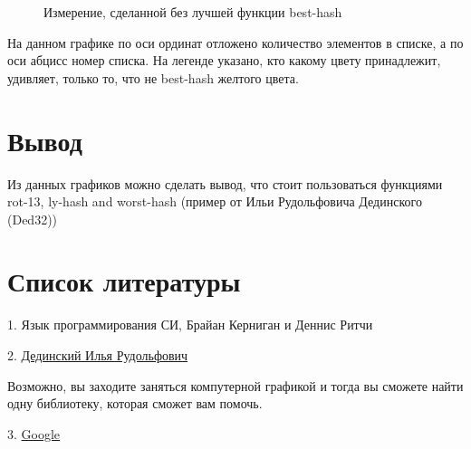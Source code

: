 \documentclass[a4paper,12pt]{article}
\begin{document}
\begin{figure}[h]
	\caption{Измерение, сделанной без лучшей функции best-hash}
\end{figure}
\newpage
На данном графике по оси ординат отложено количество элементов в списке, а по оси абцисс номер списка. На легенде указано, кто какому цвету принадлежит, удивляет, только то, что не best-hash желтого цвета.
\newpage

\section*{Вывод}
Из данных графиков можно сделать вывод, что стоит пользоваться функциями rot-13, ly-hash and worst-hash (пример от Ильи Рудольфовича Дединского (Ded32))

\section*{Список литературы}
1. Язык программирования СИ, Брайан Керниган и Деннис Ритчи

2. \href{http://ded32.net.ru}{Дединский Илья Рудольфович}

Возможно, вы заходите заняться компутерной графикой и тогда вы сможете найти одну библиотеку, которая сможет вам помочь.

3. \href{https://www.google.ru}{Google}
\end{document}
